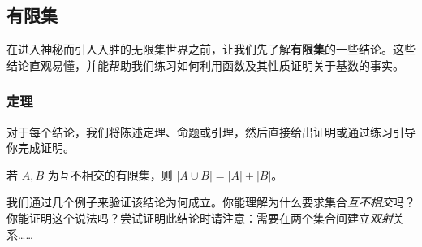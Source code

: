 
\subsection{有限集}

在进入神秘而引人入胜的无限集世界之前，让我们先了解\textbf{有限集}的一些结论。这些结论直观易懂，并能帮助我们练习如何利用函数及其性质证明关于基数的事实。

\subsubsection*{定理}

对于每个结论，我们将陈述定理、命题或引理，然后直接给出证明或通过练习引导你完成证明。

\begin{theorem}\label{theorem7.6.7}
    若 $A,B$ 为互不相交的有限集，则 $|A \cup B| = |A| + |B|$。
\end{theorem}

我们通过几个例子来验证该结论为何成立。你能理解为什么要求集合\emph{互不相交}吗？你能证明这个说法吗？尝试证明此结论时请注意：需要在两个集合间建立\emph{双射}关系……

